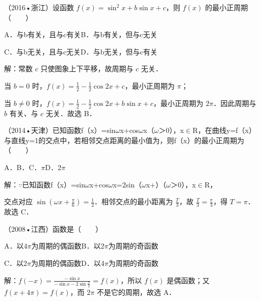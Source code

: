 \begin{question}
（2016•浙江）设函数 $f(x)=\sin^2x+b\sin x+c$，则 $f(x)$ 的最小正周期（　　）\par
A．与b有关，且与c有关\qquad{}B．与b有关，但与c无关\par
C．与b无关，且与c无关\qquad{}D．与b无关，但与c有关\par
\begin{solution}
解：常数 $c$ 只使图象上下平移，故周期与 $c$ 无关．\par
当 $b=0$ 时，$f(x)=\frac12-\frac12\cos2x+c$，最小正周期为 $\pi$；\par
当 $b\ne0$ 时，$f(x)=\frac12-\frac12\cos2x+b\sin x+c$，最小正周期为 $2\pi$．因此周期与 $b$ 有关、与 $c$ 无关．故选 B．\par
\end{solution}
\end{question}

\begin{question}
（2014•天津）已知函数f（x）=sin\ensuremath{\omega}x+cos\ensuremath{\omega}x（\ensuremath{\omega}＞0），x\ensuremath{\in}R，在曲线y=f（x）与直线y=1的交点中，若相邻交点距离的最小值为，则f（x）的最小正周期为（　　）\par
A．\qquad{}B．\qquad{}C．\ensuremath{\pi}\qquad{}D．2\ensuremath{\pi}\par
\begin{solution}
解：\ensuremath{\because}已知函数f（x）=sin\ensuremath{\omega}x+cos\ensuremath{\omega}x=2sin（\ensuremath{\omega}x+）（\ensuremath{\omega}＞0），x\ensuremath{\in}R，\par
交点对应 $\sin(\omega x+\frac{\pi}{6})=\frac12$．相邻交点的最小距离为 $\frac T3$，故 $\frac T3=\frac{\pi}{3}$，得 $T=\pi$．故选 C．\par
\end{solution}
\end{question}

\begin{question}
（2008•江西）函数是（　　）\par
A．以4\ensuremath{\pi}为周期的偶函数\qquad{}B．以2\ensuremath{\pi}为周期的奇函数\par
C．以2\ensuremath{\pi}为周期的偶函数\qquad{}D．以4\ensuremath{\pi}为周期的奇函数\par
\begin{solution}
解：$f(-x)=\frac{-\sin x}{-\sin x-2\sin\frac{x}{2}}=f(x)$，所以 $f(x)$ 是偶函数；又 $f(x+4\pi)=f(x)$，而 $2\pi$ 不是它的周期，故选 A．\par
\end{solution}
\end{question}

